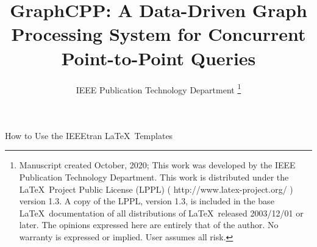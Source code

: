 \documentclass[lettersize,journal]{IEEEtran} %
\begin{document}
\title{GraphCPP: A Data-Driven Graph Processing System for Concurrent Point-to-Point Queries} %
\author{IEEE Publication Technology Department %
\thanks{Manuscript created October, 2020; This work was developed by the IEEE Publication Technology Department. This work is distributed under the \LaTeX \ Project Public License (LPPL) ( http://www.latex-project.org/ ) version 1.3. A copy of the LPPL, version 1.3, is included in the base \LaTeX \ documentation of all distributions of \LaTeX \ released 2003/12/01 or later. The opinions expressed here are entirely that of the author. No warranty is expressed or implied. User assumes all risk.}} %

{How to Use the IEEEtran \LaTeX \ Templates} 

\maketitle %

\graphicspath{{E:/华科实验室论文/MyDocument/并发点对点查询/论文草稿/picture/}}
\end{document}
